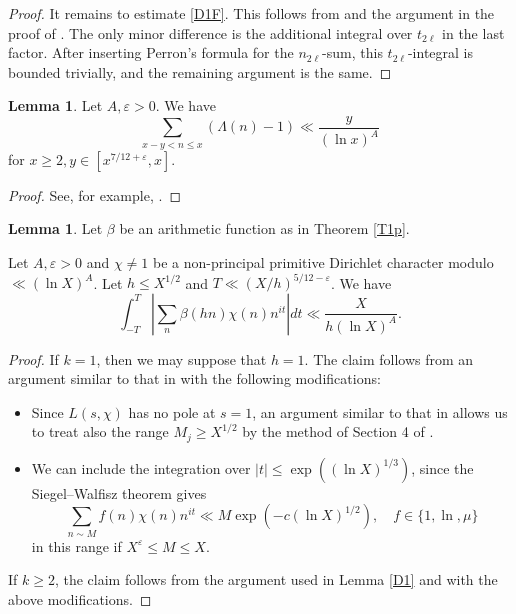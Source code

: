 \documentclass{amsart}
\theoremstyle{definition}
\newtheorem{lem}[dfn]{Lemma}
\theoremstyle{remark}
\newcommand{\1}{
    \bm{1}
}
\begin{document}
\begin{proof}
It remains to estimate \eqref{D1F}. This follows from \cite[Theorem 2.1]{choi2006mean} and the argument in the proof of \cite[Theorem 1.1]{choi2006mean}. The only minor difference is the additional integral over \(t_{2\ell}\) in the last factor. 
After inserting Perron's formula for the \(n_{2\ell}\)-sum, this \(t_{2\ell}\)-integral is bounded trivially, and the remaining argument is the same.
\end{proof}






\begin{lem}\label{D21}
Let $A,\varepsilon>0$. We have
\begin{equation} \sum_{x-y<n \leq x} (\Lambda(n) - 1) \ll \frac{y}{(\ln{x})^A} \end{equation}
for $x \geq 2, y \in [x^{7/12+\varepsilon},x]$. 
\end{lem}



\begin{proof}
See, for example, \cite{heath1982prime}. 
\end{proof}





\begin{lem}\label{D22}
Let $\beta$ be an arithmetic function as in Theorem \ref{T1p}. 

Let $A,\varepsilon>0$ and $\chi \neq 1$ be a non-principal primitive Dirichlet character modulo $\ll (\ln{X})^A$. Let $h \leq X^{1/2}$ and $T \ll (X/h)^{5/12-\varepsilon}$. 
We have
\begin{equation} \int_{-T}^{T} \left| \sum_{n} \beta(hn) \chi(n) n^{it} \right| dt \ll \frac{X}{h(\ln{X})^A}. \label{short_chi} \end{equation} 
\end{lem}



\begin{proof}
If $k=1$, then we may suppose that $h=1$. The claim follows from an argument similar to that in \cite{heath1982prime} with the following modifications:
\begin{itemize}
\item Since \(L(s,\chi)\) has no pole at \(s=1\), an argument similar to that in \cite[Lemma 2.3]{choi2006mean} allows us to treat also the range \(M_j \geq X^{1/2}\) by the method of Section 4 of \cite{heath1982prime}. 
\item We can include the integration over $|t| \leq \exp((\ln{X})^{1/3})$, since the Siegel--Walfisz theorem gives
\[ \sum_{n \sim M} f(n) \chi(n) n^{it} \ll M \exp\left( - c (\ln{X})^{1/2} \right), \quad f \in \{1,\ln,\mu\} \]
in this range if $X^{\varepsilon} \leq M \leq X$. 
\end{itemize}


If $k\geq 2$, the claim follows from the argument used in Lemma \ref{D1} and \cite{heath1982prime} with the above modifications. 
\end{proof}
\end{document}

